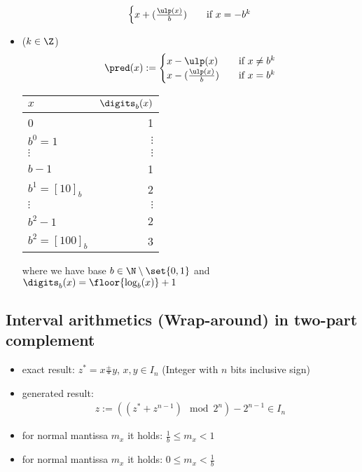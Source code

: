 \begin{itemize}
\begin{align*}
\begin{cases}
  		x+(\frac{\ulp(x)}{b}) &\quad \text{if } x=-b^k
  	\end{cases}
  \end{align*}
  \item {} ($k\in \Z$)
  \begin{align*}
  	\pred(x) := \begin{cases}
  		x-\ulp(x)& \quad\text{if } x\neq b^k\\
  		x-(\frac{\ulp(x)}{b})& \quad\text{if } x=b^k	
  	\end{cases}
  \end{align*}
  \begin{tabular}{l|r} %
  	\textbf{$x$}   & $\digits_b(x)$\\ \hline
  	0 & 1\\
  	$b^0 = 1$ & $\vdots$ \\
  	$\vdots$ & $\vdots$ \\
  	$b-1$ & 1\\
  	$b^1 = [10]_b$ & 2\\
  	$\vdots$ & $\vdots$\\
  	$b^2 -1$ & 2\\
  	$b^2 = [100]_b$ & 3\\
  \end{tabular}
	where we have base $b \in \N\setminus \set{0,1}$ and $\digits_b(x) = \floor{ \log_b(x)} +1$
\end{itemize}
\subsection*{Interval arithmetics (Wrap-around) in two-part complement}
	\begin{itemize}
		\item exact result: $z^* =x\frac{\pm}{\ast} y$, $x,y\in I_n$ (Integer with $n$ bits inclusive sign)
		\item generated result: 
		\begin{align*}
			z:=((z^*+z^{n-1})\mod2^n)-2^{n-1}\in I_n
		\end{align*}
		\item for normal mantissa $m_x$ it holds: $\frac{1}{b}\le m_x<1$
		\item  for normal mantissa $m_x$ it holds: $0\le m_x<\frac{1}{b}$
	\end{itemize}

